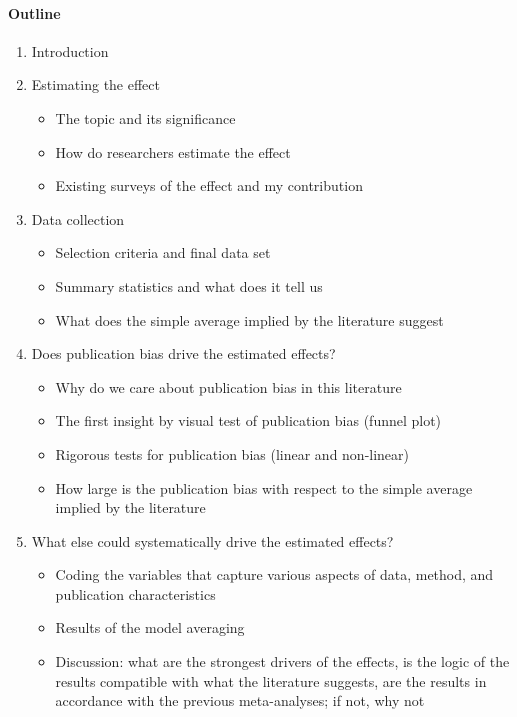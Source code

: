 \paragraph{Outline}
\begin{enumerate}
	\item Introduction
	\item Estimating the effect
	    \begin{itemize}
            \item The topic and its significance
            \item How do researchers estimate the effect
            \item Existing surveys of the effect and my contribution
        \end{itemize}
	\item Data collection
	    \begin{itemize}
            \item Selection criteria and final data set 
            \item Summary statistics and what does it tell us
            \item What does the simple average implied by the literature suggest
        \end{itemize}
	\item Does publication bias drive the estimated effects?
	    \begin{itemize}
            \item Why do we care about publication bias in this literature
            \item The first insight by visual test of publication bias (funnel plot)
            \item Rigorous tests for publication bias (linear and non-linear)
            \item How large is the publication bias with respect to the simple average implied by the literature
        \end{itemize}
	\item What else could systematically drive the estimated effects?
	    \begin{itemize}
            \item Coding the variables that capture various aspects of data, method, and publication characteristics 
            \item Results of the model averaging
            \item Discussion: what are the strongest drivers of the effects, is the logic of the results compatible with what the literature suggests, are the results in accordance with the previous meta-analyses; if not, why not

\end{itemize}
\end{enumerate}

